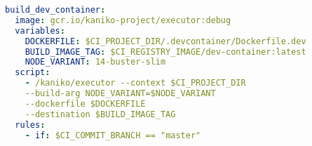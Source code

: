 
\begin{lstlisting}[language=yml,caption={GitLab \ac{CI} build file for Docker Images},breaklines=true,label={code::ci_build_yml}]
build_dev_container:
  image: gcr.io/kaniko-project/executor:debug
  variables:
    DOCKERFILE: $CI_PROJECT_DIR/.devcontainer/Dockerfile.dev
    BUILD_IMAGE_TAG: $CI_REGISTRY_IMAGE/dev-container:latest
    NODE_VARIANT: 14-buster-slim
  script:
    - /kaniko/executor --context $CI_PROJECT_DIR
    --build-arg NODE_VARIANT=$NODE_VARIANT
    --dockerfile $DOCKERFILE
    --destination $BUILD_IMAGE_TAG
  rules:
    - if: $CI_COMMIT_BRANCH == "master"

\end{lstlisting}
